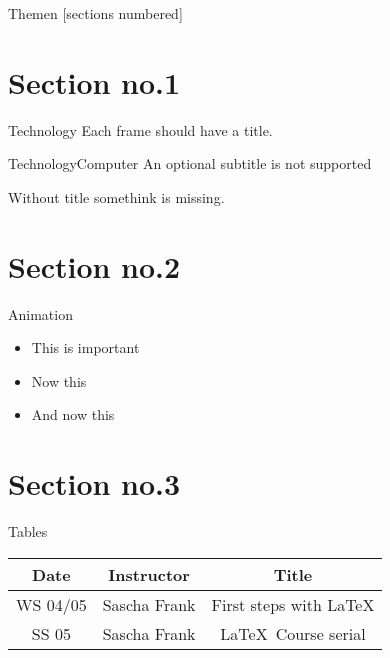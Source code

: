 



\maketitle

\begin{frame}{Themen} %
  [sections numbered]
  \tableofcontents[hideallsubsections]
\end{frame}

\section{Section no.1}
  \begin{frame}{Technology}
      Each frame should have a title.
  \end{frame}

  \begin{frame}{Technology}{Computer}
      An optional subtitle is not supported
  \end{frame}

  \begin{frame}{}
    Without title somethink is missing.
  \end{frame}


\section{Section no.2}
  \begin{frame}{Animation}
    \begin{itemize}[<+- | alert@+>]
      \item \alert<4>{This is important}
      \item Now this
      \item And now this
    \end{itemize}
  \end{frame}

\section{Section no.3}
  \begin{frame}{Tables}
    \begin{tabular}{|c|c|c|}
      \hline
      \textbf{Date} & \textbf{Instructor} & \textbf{Title} \\
      \hline
      WS 04/05 & Sascha Frank & First steps with  \LaTeX  \\
      \hline
      SS 05 & Sascha Frank & \LaTeX \ Course serial \\
      \hline
    \end{tabular}
  \end{frame}

